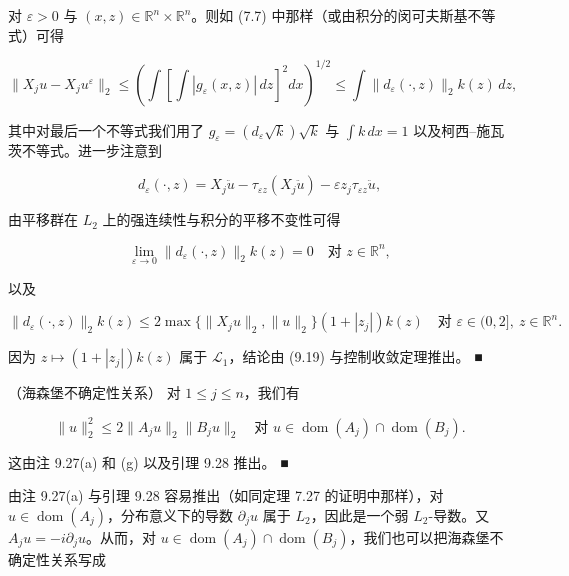 \begin{lemma}
\begin{subitems}
对 $ \varepsilon > 0 $ 与 $ (x,z) \in \mathbb{R}^n \times \mathbb{R}^n $。则如 (7.7) 中那样（或由积分的闵可夫斯基不等式）可得

\begin{equation}
\|X_j u - X_j u^\varepsilon\|_2 \le \left(\int\left[\int |g_\varepsilon(x,z)|\,dz\right]^2 dx\right)^{1/2} \le \int \|d_\varepsilon(\cdot,z)\|_2 k(z)\,dz ,\tag{9.19}
\end{equation}

其中对最后一个不等式我们用了 $ g_\varepsilon = (d_\varepsilon\sqrt{k})\sqrt{k} $ 与 $ \int k\,dx = 1 $ 以及柯西–施瓦茨不等式。进一步注意到

\[
d_\varepsilon(\cdot,z) = X_j\ddot{u} - \tau_{\varepsilon z}(X_j\ddot{u}) - \varepsilon z_j \tau_{\varepsilon z}\ddot{u} ,
\]

由平移群在 $ L_2 $ 上的强连续性与积分的平移不变性可得

\[
\lim_{\varepsilon \to 0} \|d_\varepsilon(\cdot,z)\|_2 k(z) = 0 \quad \text{对 } z \in \mathbb{R}^n ,
\]

以及

\[
\|d_\varepsilon(\cdot,z)\|_2 k(z) \le 2\max\{\|X_j u\|_2, \|u\|_2\}(1 + |z_j|)k(z) \quad \text{对 } \varepsilon \in (0,2] , \ z \in \mathbb{R}^n .
\]

因为 $ z \mapsto (1 + |z_j|)k(z) $ 属于 $ \mathcal{L}_1 $，结论由 (9.19) 与控制收敛定理推出。 \nobreak\hspace{0.35em}■

\end{subitems}

\end{lemma}

\begin{corollary}

（海森堡不确定性关系） 对 $ 1 \le j \le n $，我们有

\[
\|u\|_2^2 \le 2\|A_j u\|_2 \|B_j u\|_2 \quad \text{对 } u \in \operatorname{dom}(A_j) \cap \operatorname{dom}(B_j) .
\]

\proofhead
这由注 9.27(a) 和 (g) 以及引理 9.28 推出。 \nobreak\hspace{0.35em}■
\end{corollary}

由注 9.27(a) 与引理 9.28 容易推出（如同定理 7.27 的证明中那样），对 $ u \in \operatorname{dom}(A_j) $，分布意义下的导数 $ \partial_j u $ 属于 $ L_2 $，因此是一个弱 $ L_2 $-导数。又 $ A_j u = -i\partial_j u $。从而，对 $ u \in \operatorname{dom}(A_j) \cap \operatorname{dom}(B_j) $，我们也可以把海森堡不确定性关系写成

